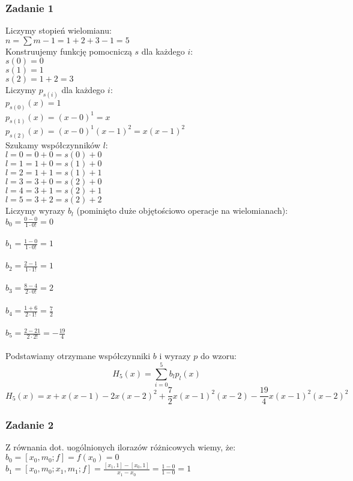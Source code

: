 \documentclass[a4paper]{article}
\begin{document}
\subsubsection*{Zadanie 1}
Liczymy stopień wielomianu:\\
$n = \sum m - 1 = 1+2+3 - 1 = 5$\\
Konstruujemy funkcję pomocniczą $s$ dla każdego $i$:\\
$s(0) = 0$\\
$s(1) = 1$\\
$s(2) = 1+2 = 3$\\
Liczymy $p_{s(i)}$ dla każdego $i$:\\
$p_{s(0)}(x) = 1$\\
$p_{s(1)}(x) = (x-0)^1 = x$\\
$p_{s(2)}(x) = (x-0)^1(x-1)^2 = x(x-1)^2$\\
Szukamy współczynników $l$:\\
$l = 0 = 0+0 = s(0) + 0$\\
$l = 1 = 1+0 = s(1) + 0$\\
$l = 2 = 1+1 = s(1) + 1$\\
$l = 3 = 3+0 = s(2) + 0$\\
$l = 4 = 3+1 = s(2) + 1$\\
$l = 5 = 3+2 = s(2) + 2$\\
Liczymy wyrazy $b_l$ (pominięto duże objętościowo operacje na wielomianach):\\
$b_0 = \frac{0-0}{1 \cdot 0!} = 0$\\\\
$b_1 = \frac{1-0}{1 \cdot 0!} = 1$\\\\
$b_2 = \frac{2-1}{1 \cdot 1!} = 1$\\\\
$b_3 = \frac{8-4}{2 \cdot 0!} = 2$\\\\
$b_4 = \frac{1+6}{2 \cdot 1!} = \frac{7}{2}$\\\\
$b_5 = \frac{2-21}{2 \cdot 2!} = -\frac{19}{4}$\\\\
Podstawiamy otrzymane współczynniki $b$ i wyrazy $p$ do wzoru:
$$H_5(x) = \sum_{i=0}^5 b_l p_l(x)$$
$$H_5(x) = x + x(x-1) -2x(x-2)^2 + \frac{7}{2}x(x-1)^2(x-2)-\frac{19}{4}x(x-1)^2(x-2)^2$$

\subsubsection*{Zadanie 2}
Z równania dot. uogólnionych ilorazów różnicowych wiemy, że:\\
$b_0 = [x_0,m_0; f] = f(x_0) = 0$\\
$b_1 = [x_0,m_0; x_1, m_1; f] = \frac{[x_1, 1] - [x_0, 1]}{x_1 - x_0} = \frac{1-0}{1-0} = 1$
\end{document}
